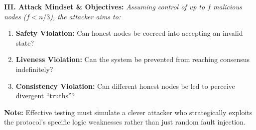 \documentclass{article}
\theoremstyle{plain}
\theoremstyle{definition}
\theoremstyle{remark}
\begin{document}
{\vspace{0.8em}
\textbf{III. Attack Mindset \& Objectives:}
\textit{Assuming control of up to $f$ malicious nodes ($f < n/3$), the attacker aims to:}
\begin{enumerate}
    \item \textbf{Safety Violation:} Can honest nodes be coerced into accepting an invalid state?
    \item \textbf{Liveness Violation:} Can the system be prevented from reaching consensus indefinitely?
    \item \textbf{Consistency Violation:} Can different honest nodes be led to perceive divergent ``truths''?
\end{enumerate}

\vspace{0.5em}
\textbf{Note:} Effective testing must simulate a clever attacker who strategically exploits the protocol's specific logic weaknesses rather than just random fault injection.
}
\end{document}
